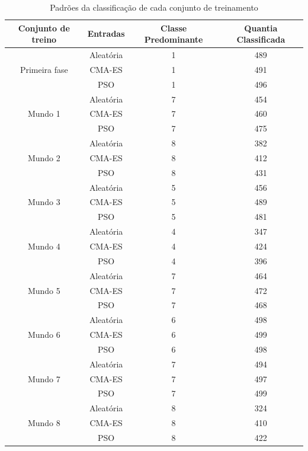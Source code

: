 \begin{table}[ht]
    \centering
    \begin{tabular}{|c|c|c|c|}
        \hline
        Conjunto de treino & Entradas & Classe Predominante & Quantia Classificada \\
        \hline
        \multirow{3}{*}{Primeira fase} & Aleatória & 1 & 489 \\
                                       & CMA-ES & 1 & 491 \\
                                       & PSO & 1 & 496 \\
        \hline
        \multirow{3}{*}{Mundo 1} & Aleatória & 7 & 454 \\
                                  & CMA-ES & 7 & 460 \\
                                  & PSO & 7 & 475 \\
        \hline
        \multirow{3}{*}{Mundo 2} & Aleatória & 8 & 382 \\
                                  & CMA-ES & 8 & 412 \\
                                  & PSO & 8 & 431 \\
        \hline
        \multirow{3}{*}{Mundo 3} & Aleatória & 5 & 456 \\
                                  & CMA-ES & 5 & 489 \\
                                  & PSO & 5 & 481 \\
        \hline
        \multirow{3}{*}{Mundo 4} & Aleatória & 4 & 347 \\
                                  & CMA-ES & 4 & 424 \\
                                  & PSO & 4 & 396 \\
        \hline
        \multirow{3}{*}{Mundo 5} & Aleatória & 7 & 464 \\
                                  & CMA-ES & 7 & 472 \\
                                  & PSO & 7 & 468 \\
        \hline
        \multirow{3}{*}{Mundo 6} & Aleatória & 6 & 498 \\
                                  & CMA-ES & 6 & 499 \\
                                  & PSO & 6 & 498 \\
        \hline
        \multirow{3}{*}{Mundo 7} & Aleatória & 7 & 494 \\
                                  & CMA-ES & 7 & 497 \\
                                  & PSO & 7 & 499 \\
        \hline
        \multirow{3}{*}{Mundo 8} & Aleatória & 8 & 324 \\
                                  & CMA-ES & 8 & 410 \\
                                  & PSO & 8 & 422 \\
        \hline
    \end{tabular}
    \caption{Padrões da classificação de cada conjunto de treinamento}
    \label{tab:conjunto_treino}
\end{table}

